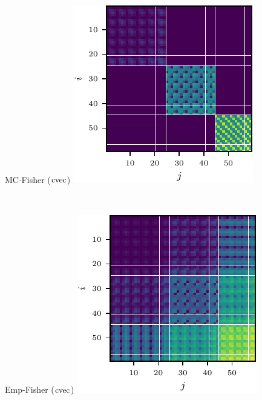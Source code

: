 \begin{figure}[!h]
\begin{minipage}[t]{0.485\linewidth}
  \end{minipage}
  \hfill
  \begin{minipage}[t]{0.485\linewidth}
    \centering
    MC-Fisher ($\operatorname{cvec}$)\vspace{1ex}
    \includegraphics[width=1.0\linewidth]{../kfs/plots/synthetic_cvec_mcfisher_100_kfac.pdf}
  \end{minipage}
  \\
  \begin{minipage}[t]{0.485\linewidth}
    \centering
    Emp-Fisher ($\operatorname{cvec}$)\vspace{1ex}
    \includegraphics[width=1.0\linewidth]{../kfs/plots/synthetic_cvec_empfisher_full.pdf}

\end{minipage}
\end{figure}
